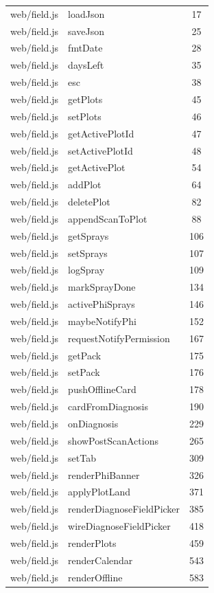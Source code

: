 \begin{center}
\begin{longtable}{@{}p{4.6cm}p{5.2cm}c@{}}
web/field.js & loadJson & 17 \\
web/field.js & saveJson & 25 \\
web/field.js & fmtDate & 28 \\
web/field.js & daysLeft & 35 \\
web/field.js & esc & 38 \\
web/field.js & getPlots & 45 \\
web/field.js & setPlots & 46 \\
web/field.js & getActivePlotId & 47 \\
web/field.js & setActivePlotId & 48 \\
web/field.js & getActivePlot & 54 \\
web/field.js & addPlot & 64 \\
web/field.js & deletePlot & 82 \\
web/field.js & appendScanToPlot & 88 \\
web/field.js & getSprays & 106 \\
web/field.js & setSprays & 107 \\
web/field.js & logSpray & 109 \\
web/field.js & markSprayDone & 134 \\
web/field.js & activePhiSprays & 146 \\
web/field.js & maybeNotifyPhi & 152 \\
web/field.js & requestNotifyPermission & 167 \\
web/field.js & getPack & 175 \\
web/field.js & setPack & 176 \\
web/field.js & pushOfflineCard & 178 \\
web/field.js & cardFromDiagnosis & 190 \\
web/field.js & onDiagnosis & 229 \\
web/field.js & showPostScanActions & 265 \\
web/field.js & setTab & 309 \\
web/field.js & renderPhiBanner & 326 \\
web/field.js & applyPlotLand & 371 \\
web/field.js & renderDiagnoseFieldPicker & 385 \\
web/field.js & wireDiagnoseFieldPicker & 418 \\
web/field.js & renderPlots & 459 \\
web/field.js & renderCalendar & 543 \\
web/field.js & renderOffline & 583 \\

\end{longtable}
\end{center}
